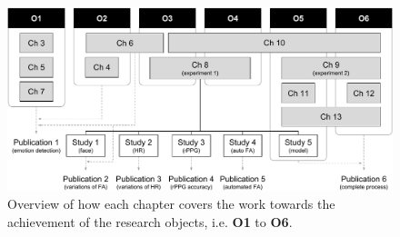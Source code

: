 \begin{figure}[h]
    \centering
    \includegraphics[width=\textwidth]{Content/figures/research-chapters-overview}
    \caption{Overview of how each chapter covers the work towards the achievement of the research objects, i.e. \textbf{O1} to \textbf{O6}.}
    \label{fig:research-chapters-overview}
\end{figure}

